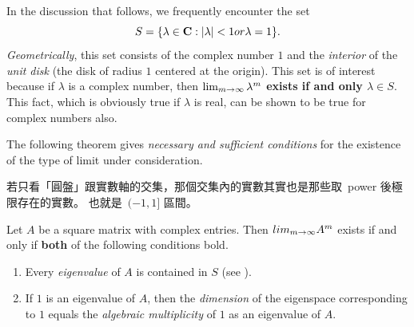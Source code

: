 \begin{remark} \label{remark 5.3.2}
In the discussion that follows, we frequently encounter the set
\[
    S = \{ \lambda \in \mathbf{C}: \lvert\lambda\rvert < 1 or \lambda = 1 \}.
\]
\emph{Geometrically}, this set consists of the complex number \(1\) and the \emph{interior} of the \emph{unit disk}
(the disk of radius \(1\) centered at the origin).
This set is of interest because if \(\lambda\) is a complex number, then \textbf{\(\lim_{m \to \infty} \lambda^m\) exists if and only \(\lambda \in S\)}.
This fact, which is obviously true if \(\lambda\) is real, can be shown to be true for complex numbers also.

The following theorem gives \emph{necessary and sufficient conditions} for the existence of the type of limit under consideration.
\end{remark}

\begin{note}
若只看「圓盤」跟實數軸的交集，那個交集內的實數其實也是那些取\ power 後極限存在的實數。
也就是\ \((-1, 1]\) 區間。
\end{note}

\begin{theorem} \label{thm 5.12}
Let \(A\) be a square matrix with complex entries.
Then \(lim_{m \to \infty} A^m\) exists if and only if \textbf{both} of the following conditions bold.
\begin{enumerate}
\item Every \emph{eigenvalue} of \(A\) is contained in \(S\) (see ).
\item If \(1\) is an eigenvalue of \(A\), then the \emph{dimension} of the eigenspace corresponding to \(1\) equals the \emph{algebraic multiplicity} of \(1\) as an eigenvalue of \(A\).
\end{enumerate}
\end{theorem}

